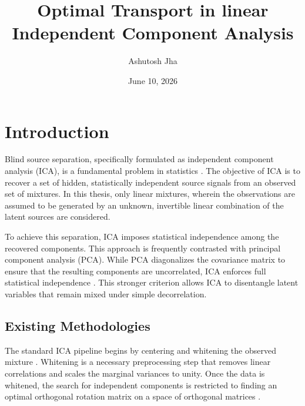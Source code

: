 \documentclass[12pt,a4paper,twoside,openany]{book}
\title{Optimal Transport in linear Independent Component Analysis}
\author{Ashutosh Jha}
\date{June 10, 2026} %
\begin{document}
\maketitle

\clearpage
\listoffigures
\clearpage
\listoftables
\cleardoublepage

\chapter{Introduction}

Blind source separation, specifically formulated as independent component analysis (ICA), is a fundamental problem in statistics \cite{jutten1985}. 
The objective of ICA is to recover a set of hidden, statistically independent source signals from an observed set of mixtures. 
In this thesis, only linear mixtures, wherein the observations are assumed to be generated 
by an unknown, invertible linear combination of the latent sources are considered.

To achieve this separation, ICA imposes statistical independence among the recovered components. 
This approach is frequently contrasted with principal component analysis (PCA). While PCA diagonalizes the covariance matrix 
to ensure that the resulting components are uncorrelated, ICA enforces full statistical independence \cite[Chapter 1]{hyvarinen2001}. 
This stronger criterion allows ICA to disentangle latent variables that remain mixed under simple decorrelation.

\section{Existing Methodologies}

The standard ICA pipeline begins by centering and whitening the observed mixture \cite{hyvarinen2001}. 
Whitening is a necessary preprocessing step that removes linear correlations and scales the marginal variances to unity. 
Once the data is whitened, the search for independent components is restricted to finding 
an optimal orthogonal rotation matrix on a space of orthogonal matrices \cite{absil2008optimization}.
\end{document}
